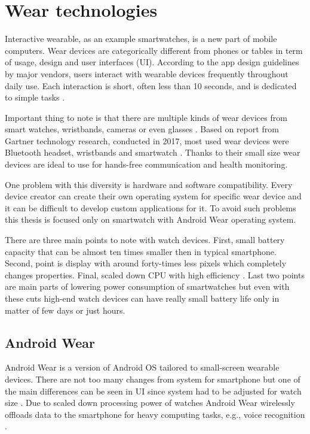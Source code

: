 \section{Wear technologies}\label{sec:WearTechnologies}
Interactive wearable, as an example smartwatches, is a new part of mobile computers. Wear devices are categorically different from phones or tables in term of usage, design and user interfaces (UI). According to the app design guidelines by major vendors, users interact with wearable devices frequently throughout daily use. Each interaction is short, often less than 10 seconds, and is dedicated to simple tasks \cite{UtCoAWO}. 

Important thing to note is that there are multiple kinds of wear devices from smart watches, wristbands, cameras or even glasses \cite{MIWD}. Based on report from Gartner technology research, conducted in 2017, most used wear devices were Bluetooth headset, wristbands and smartwatch \cite{GSWWDS}. Thanks to their small size wear devices are ideal to use for hands-free communication and health monitoring.

One problem with this diversity is hardware and software compatibility. Every device creator can create their own operating system for specific wear device and it can be difficult to develop custom applications for it. To avoid such problems this thesis is focused only on smartwatch with Android Wear operating system. 

There are three main points to note with watch devices. First, small battery capacity that can be almost ten times smaller then in typical smartphone. Second, point is display with around forty-times less pixels which completely changes properties. Final, scaled down CPU with high efficiency \cite{UtCoAWO}. Last two points are main parts of lowering power consumption of smartwatches but even with these cuts high-end watch devices can have really small battery life only in matter of few days or just hours.

\subsection{Android Wear}\label{sec:AndroidWear}
Android Wear is a version of Android OS tailored to small-screen wearable devices. There are not too many changes from system for smartphone but one of the main differences can be seen in UI since system had to be adjusted for watch size \cite{CSUITW}. Due to scaled down processing power of watches Android Wear wirelessly offloads data to the smartphone for heavy computing tasks, e.g., voice recognition \cite{UCAW}.

